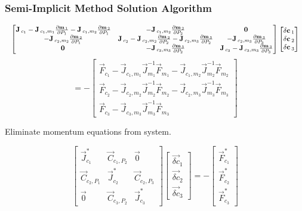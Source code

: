 \documentclass[compress,xcolor=table]{beamer}
\begin{document}
\begin{frame}
\frametitle{Semi-Implicit Method Solution Algorithm}

\begin{equation*}
\resizebox{1.0\textwidth}{!}{$
\begin{bmatrix} 
\vec{J}_{c_1} - \vec{J}_{c_1,m_1}\frac{\partial \vec{m}_1}{\partial P_1} - \vec{J}_{c_1,m_2}\frac{\partial \vec{m}_2}{\partial P_1} &
-\vec{J}_{c_1,m_2}\frac{\partial \vec{m}_2}{\partial P_2} &
\vec{0} \\
-\vec{J}_{c_2,m_2}\frac{\partial \vec{m}_2}{\partial P_1} & 
\vec{J}_{c_2} - \vec{J}_{c_2,m_2}\frac{\partial \vec{m}_2}{\partial P_2}-\vec{J}_{c_2,m_3}\frac{\partial \vec{m}_3}{\partial P_2} &
-\vec{J}_{c_2,m_3}\frac{\partial \vec{m}_3}{\partial P_3} \\
 \vec{0} &
-\vec{J}_{c_3,m_3}\frac{\partial \vec{m}_3}{\partial P_2} &
\vec{J}_{c_3} -\vec{J}_{c_3,m_3}\frac{\partial \vec{m}_3}{\partial P_3} 
\end{bmatrix}\begin{bmatrix}
\vec{\delta c}_{1} \\
\vec{\delta c}_{2} \\
\vec{\delta c}_{3}
\end{bmatrix}
$}
\end{equation*}
\begin{equation*}
= -\begin{bmatrix}
\vec{F}_{c_1} -
\vec{J}_{c_1,m_1}\vec{J}^{-1}_{m_1}\vec{F}_{m_1}-\vec{J}_{c_1,m_2}\vec{J}^{-1}_{m_2}\vec{F}_{m_2} \\
\vec{F}_{c_2} - 
\vec{J}_{c_2,m_2}\vec{J}^{-1}_{m_2}\vec{F}_{m_2}-\vec{J}_{c_2,m_3}\vec{J}^{-1}_{m_3}\vec{F}_{m_3} \\
\vec{F}_{c_3} - 
\vec{J}_{c_3,m_3}\vec{J}^{-1}_{m_3}\vec{F}_{m_3}
\end{bmatrix}
\end{equation*}

Eliminate momentum equations from system.

\begin{equation*}
\begin{bmatrix} 
\vec{J}^{*}_{c_1} & \vec{C}_{c_1,P_2} & \vec{0} \\
\vec{C}_{c_2,P_1} & \vec{J}^{*}_{c_2} & \vec{C}_{c_2,P_3} \\
\vec{0}           & \vec{C}_{c_3,P_2} & \vec{J}^{*}_{c_3}
\end{bmatrix} \begin{bmatrix}
\vec{\delta c}_{1} \\
\vec{\delta c}_{2} \\
\vec{\delta c}_{3}
\end{bmatrix}  = -\begin{bmatrix}
\vec{F}^{*}_{c_1} \\
\vec{F}^{*}_{c_2} \\
\vec{F}^{*}_{c_3}
\end{bmatrix}
\end{equation*}

\end{frame}
\end{document}
